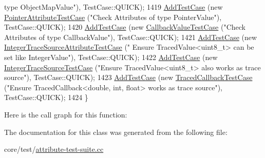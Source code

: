 \begin{DoxyCode}
{       type ObjectMapValue"}), TestCase::QUICK);
1419   \hyperlink{classns3_1_1TestCase_a3718088e3eefd5d6454569d2e0ddd835}{AddTestCase} (\textcolor{keyword}{new} \hyperlink{classPointerAttributeTestCase}{PointerAttributeTestCase} (\textcolor{stringliteral}{"Check Attributes of type
       PointerValue"}), TestCase::QUICK);
1420   \hyperlink{classns3_1_1TestCase_a3718088e3eefd5d6454569d2e0ddd835}{AddTestCase} (\textcolor{keyword}{new} \hyperlink{classCallbackValueTestCase}{CallbackValueTestCase} (\textcolor{stringliteral}{"Check Attributes of type
       CallbackValue"}), TestCase::QUICK);
1421   \hyperlink{classns3_1_1TestCase_a3718088e3eefd5d6454569d2e0ddd835}{AddTestCase} (\textcolor{keyword}{new} \hyperlink{classIntegerTraceSourceAttributeTestCase}{IntegerTraceSourceAttributeTestCase} (\textcolor{stringliteral}{"
      Ensure TracedValue<uint8\_t> can be set like IntegerValue"}), TestCase::QUICK);
1422   \hyperlink{classns3_1_1TestCase_a3718088e3eefd5d6454569d2e0ddd835}{AddTestCase} (\textcolor{keyword}{new} \hyperlink{classIntegerTraceSourceTestCase}{IntegerTraceSourceTestCase} (\textcolor{stringliteral}{"Ensure
       TracedValue<uint8\_t> also works as trace source"}), TestCase::QUICK);
1423   \hyperlink{classns3_1_1TestCase_a3718088e3eefd5d6454569d2e0ddd835}{AddTestCase} (\textcolor{keyword}{new} \hyperlink{classTracedCallbackTestCase}{TracedCallbackTestCase} (\textcolor{stringliteral}{"Ensure TracedCallback<double,
       int, float> works as trace source"}), TestCase::QUICK);
1424 \}
\end{DoxyCode}


Here is the call graph for this function\+:




The documentation for this class was generated from the following file\+:\begin{DoxyCompactItemize}
\item 
core/test/\hyperlink{attribute-test-suite_8cc}{attribute-\/test-\/suite.\+cc}\end{DoxyCompactItemize}
